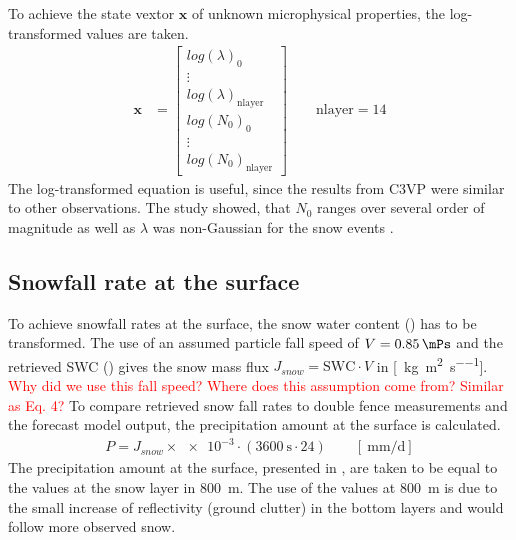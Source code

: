 To achieve the state vextor $\mathbf{x}$ of unknown microphysical properties, the log-transformed values are taken.
\begin{align}
	\mathbf{x} & = \begin{bmatrix}
		log(\lambda)_0 	\\
		\vdots 			\\
		log(\lambda)_{\text{nlayer}} 	\\
		log(N_0)_0		\\
		\vdots			\\
		log(N_0)_{\text{nlayer}}		
	\end{bmatrix} \qquad \text{nlayer} = 14
	\label{eq:snow_prop}
\end{align}
The log-transformed equation is useful, since the results from C3VP were similar to other observations. The study showed, that $N_0$ ranges over several order of magnitude as well as $\lambda$ was non-Gaussian for the snow events \cite{wood_estimation_2011}.

\subsection{Snowfall rate at the surface}
%
To achieve snowfall rates at the surface, the snow water content () has to be transformed. The use of an assumed particle fall speed of $V = \SI{0.85}{\mPs}$ and the retrieved SWC () gives the snow mass flux $J_{snow} = \text{SWC} \cdot V$ in [\SI{}{\kilogram\per\square\metre\per\second}]. \textcolor{red}{Why did we use this fall speed? Where does this assumption come from? Similar as \cite{cooper_variational_2017} Eq. 4?} 
To compare retrieved snow fall rates to double fence measurements and the forecast model output, the precipitation amount at the surface is calculated. 
\begin{align}
	P = J_{snow} \times \num{e-3} \cdot \left(\SI{3600}{\second} \cdot24 \right) \qquad [\SI{}{\mm\per\day}]
\end{align}
The precipitation amount at the surface, presented in , are taken to be equal to the values at the snow layer in \SI{800}{\metre}. The use of the values at \SI{800}{\metre} is due to the small increase of reflectivity (ground clutter) in the bottom layers and would follow more observed snow. 






